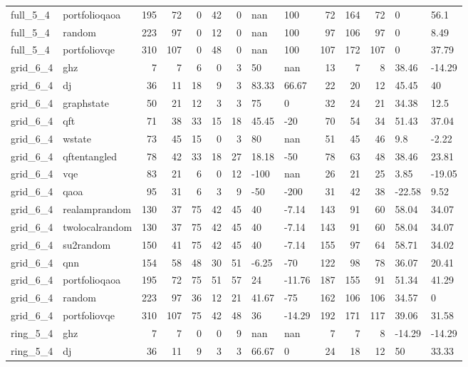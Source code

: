\begin{longtable}{llrrrrrllrrrll}
full\_5\_4 & portfolioqaoa & 195 & 72 & 0 & 42 & 0 & nan & 100 & 72 & 164 & 72 & 0 & 56.1 \\
full\_5\_4 & random & 223 & 97 & 0 & 12 & 0 & nan & 100 & 97 & 106 & 97 & 0 & 8.49 \\
full\_5\_4 & portfoliovqe & 310 & 107 & 0 & 48 & 0 & nan & 100 & 107 & 172 & 107 & 0 & 37.79 \\
grid\_6\_4 & ghz & 7 & 7 & 6 & 0 & 3 & 50 & nan & 13 & 7 & 8 & 38.46 & -14.29 \\
grid\_6\_4 & dj & 36 & 11 & 18 & 9 & 3 & 83.33 & 66.67 & 22 & 20 & 12 & 45.45 & 40 \\
grid\_6\_4 & graphstate & 50 & 21 & 12 & 3 & 3 & 75 & 0 & 32 & 24 & 21 & 34.38 & 12.5 \\
grid\_6\_4 & qft & 71 & 38 & 33 & 15 & 18 & 45.45 & -20 & 70 & 54 & 34 & 51.43 & 37.04 \\
grid\_6\_4 & wstate & 73 & 45 & 15 & 0 & 3 & 80 & nan & 51 & 45 & 46 & 9.8 & -2.22 \\
grid\_6\_4 & qftentangled & 78 & 42 & 33 & 18 & 27 & 18.18 & -50 & 78 & 63 & 48 & 38.46 & 23.81 \\
grid\_6\_4 & vqe & 83 & 21 & 6 & 0 & 12 & -100 & nan & 26 & 21 & 25 & 3.85 & -19.05 \\
grid\_6\_4 & qaoa & 95 & 31 & 6 & 3 & 9 & -50 & -200 & 31 & 42 & 38 & -22.58 & 9.52 \\
grid\_6\_4 & realamprandom & 130 & 37 & 75 & 42 & 45 & 40 & -7.14 & 143 & 91 & 60 & 58.04 & 34.07 \\
grid\_6\_4 & twolocalrandom & 130 & 37 & 75 & 42 & 45 & 40 & -7.14 & 143 & 91 & 60 & 58.04 & 34.07 \\
grid\_6\_4 & su2random & 150 & 41 & 75 & 42 & 45 & 40 & -7.14 & 155 & 97 & 64 & 58.71 & 34.02 \\
grid\_6\_4 & qnn & 154 & 58 & 48 & 30 & 51 & -6.25 & -70 & 122 & 98 & 78 & 36.07 & 20.41 \\
grid\_6\_4 & portfolioqaoa & 195 & 72 & 75 & 51 & 57 & 24 & -11.76 & 187 & 155 & 91 & 51.34 & 41.29 \\
grid\_6\_4 & random & 223 & 97 & 36 & 12 & 21 & 41.67 & -75 & 162 & 106 & 106 & 34.57 & 0 \\
grid\_6\_4 & portfoliovqe & 310 & 107 & 75 & 42 & 48 & 36 & -14.29 & 192 & 171 & 117 & 39.06 & 31.58 \\
ring\_5\_4 & ghz & 7 & 7 & 0 & 0 & 9 & nan & nan & 7 & 7 & 8 & -14.29 & -14.29 \\
ring\_5\_4 & dj & 36 & 11 & 9 & 3 & 3 & 66.67 & 0 & 24 & 18 & 12 & 50 & 33.33 \\

\end{longtable}
